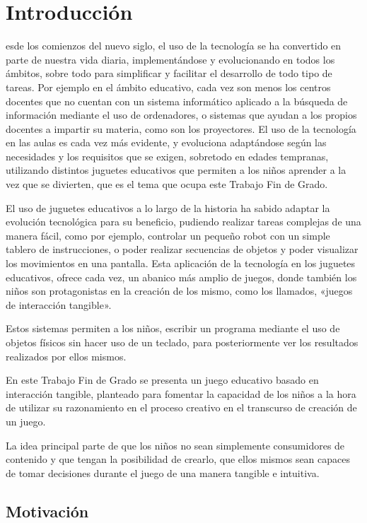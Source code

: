 \chapter{Introducción}

\noindent
{}esde los comienzos del nuevo siglo, el uso de la tecnología se ha convertido en parte de nuestra vida diaria, implementándose y evolucionando en todos los ámbitos, sobre todo para simplificar y facilitar el desarrollo de todo tipo de tareas. Por ejemplo en el ámbito educativo, cada vez son menos los centros docentes que no cuentan con un sistema informático aplicado a la búsqueda de información mediante el uso de ordenadores, o sistemas que ayudan a los propios docentes a impartir su materia, como son los proyectores. El uso de la tecnología en las aulas es cada vez más evidente, y evoluciona adaptándose según las necesidades y los requisitos que se exigen, sobretodo en edades tempranas, utilizando distintos juguetes educativos que permiten a los niños aprender a la vez que se divierten, que es el tema que ocupa este Trabajo Fin de Grado.

El uso de juguetes educativos a lo largo de la historia ha sabido adaptar la evolución tecnológica para su beneficio, pudiendo realizar tareas complejas de una manera fácil, como por ejemplo, controlar un pequeño robot con un simple tablero de instrucciones, o poder realizar secuencias de objetos y poder visualizar los movimientos en una pantalla. Esta aplicación de la tecnología en los juguetes educativos, ofrece cada vez, un abanico más amplio de juegos, donde también los niños son protagonistas en la creación de los mismo, como los llamados, «juegos de interacción tangible».

Estos sistemas permiten a los niños, escribir un programa mediante el uso de objetos físicos sin hacer uso de un teclado, para posteriormente ver los resultados realizados por ellos mismos.

En este Trabajo Fin de Grado se presenta un juego educativo basado en interacción tangible, planteado para fomentar la capacidad de los niños a la hora de utilizar su razonamiento en el proceso creativo en el transcurso de creación de un juego.

La idea principal parte de que los niños no sean simplemente consumidores de contenido y que tengan la posibilidad de crearlo, que ellos mismos sean capaces de tomar decisiones durante el juego de una manera tangible e intuitiva.




\section{Motivación}

